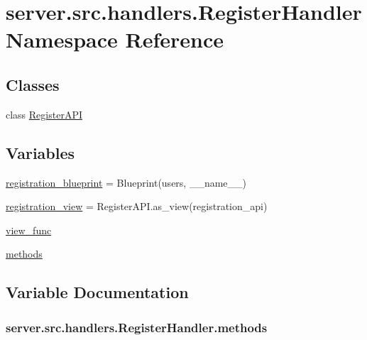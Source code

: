 \hypertarget{namespaceserver_1_1src_1_1handlers_1_1_register_handler}{}\section{server.\+src.\+handlers.\+Register\+Handler Namespace Reference}
\label{namespaceserver_1_1src_1_1handlers_1_1_register_handler}
\subsection*{Classes}
\begin{DoxyCompactItemize}
\item 
class \hyperlink{classserver_1_1src_1_1handlers_1_1_register_handler_1_1_register_a_p_i}{Register\+A\+PI}
\end{DoxyCompactItemize}
\subsection*{Variables}
\begin{DoxyCompactItemize}
\item 
\hyperlink{namespaceserver_1_1src_1_1handlers_1_1_register_handler_afce21eacbe2ae16cdf4637aed324a93b}{registration\+\_\+blueprint} = Blueprint(\textquotesingle{}users\textquotesingle{}, \+\_\+\+\_\+name\+\_\+\+\_\+)
\item 
\hyperlink{namespaceserver_1_1src_1_1handlers_1_1_register_handler_aaf26ae647614acc866fbb90882f4e3c8}{registration\+\_\+view} = Register\+A\+P\+I.\+as\+\_\+view(\textquotesingle{}registration\+\_\+api\textquotesingle{})
\item 
\hyperlink{namespaceserver_1_1src_1_1handlers_1_1_register_handler_a6be70d95ab826685feb65087c99c514b}{view\+\_\+func}
\item 
\hyperlink{namespaceserver_1_1src_1_1handlers_1_1_register_handler_a1ef2f67e4e22f57354c300ef05faa2d2}{methods}
\end{DoxyCompactItemize}


\subsection{Variable Documentation}
\subsubsection[{\texorpdfstring{methods}{methods}}]{\setlength{\rightskip}{0pt plus 5cm}server.\+src.\+handlers.\+Register\+Handler.\+methods}\hypertarget{namespaceserver_1_1src_1_1handlers_1_1_register_handler_a1ef2f67e4e22f57354c300ef05faa2d2}{}\label{namespaceserver_1_1src_1_1handlers_1_1_register_handler_a1ef2f67e4e22f57354c300ef05faa2d2}


